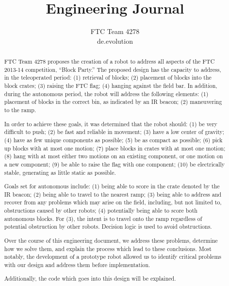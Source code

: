 \documentclass{article}
\title{\textbf{Engineering Journal}}
\author{FTC Team 4278\\de.evolution}
\date{}
\begin{document}
\maketitle

\begin{abstract}
FTC Team 4278 proposes the creation of a robot to address all aspects of the FTC 2013-14 competition, ``Block Party.'' The proposed design has the capacity to address, in the teleoperated period: (1) retrieval of blocks; (2) placement of blocks into the block crates; (3) raising the FTC flag; (4) hanging against the field bar. In addition, during the autonomous period, the robot will address the following elements: (1) placement of blocks in the correct bin, as indicated by an IR beacon; (2) maneuvering to the ramp. 

In order to achieve these goals, it was determined that the robot should: (1) be very difficult to push; (2) be fast and reliable in movement; (3) have a low center of gravity; (4) have as few unique components as possible; (5) be as compact as possible; (6) pick up blocks with at most one motion; (7) place blocks in crates with at most one motion; (8) hang with at most either two motions on an existing component, or one motion on a new component; (9) be able to raise the flag with one component; (10) be electrically stable, generating as little static as possible. 

Goals set for autonomous include: (1) being able to score in the crate denoted by the IR beacon; (2) being able to travel to the nearest ramp; (3) being able to address and recover from any problems which may arise on the field, including, but not limited to, obstructions caused by other robots; (4) potentially being able to score both autonomous blocks. For (3), the intent is to travel onto the ramp regardless of potential obstruction by other robots. Decision logic is used to avoid obstructions.

Over the course of this engineering document, we address these problems, determine how we solve them, and explain the process which lead to these conclusions. Most notably, the development of a prototype robot allowed us to identify critical problems with our design and address them before implementation.

Additionally, the code which goes into this design will be explained.
\end{abstract}\tableofcontents\newpage
\end{document}
